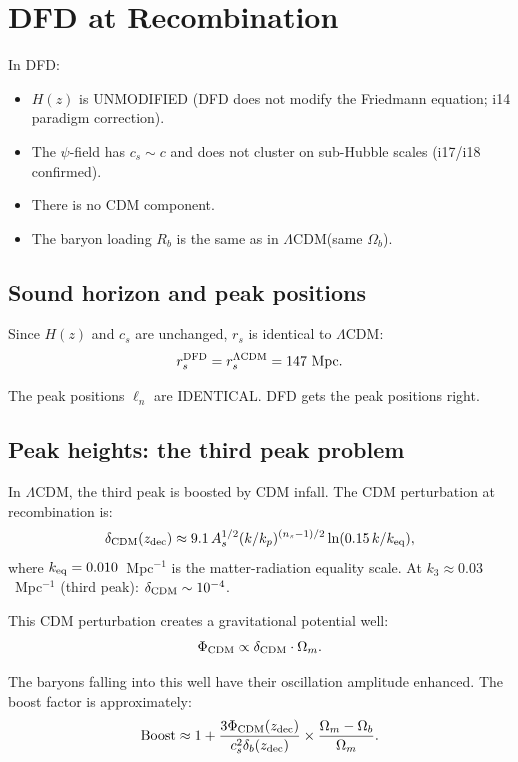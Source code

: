 \documentclass[11pt]{article}
\newcommand{\LCDM}{$\Lambda$CDM}
\newcommand{\Ob}{\Omega_b}
\newcommand{\Om}{\Omega_m}
\begin{document}
\section{DFD at Recombination}

In DFD:
\begin{itemize}
\item $H(z)$ is UNMODIFIED (DFD does not modify the Friedmann
  equation; i14 paradigm correction).
\item The $\psi$-field has $c_s \sim c$ and does not cluster on
  sub-Hubble scales (i17/i18 confirmed).
\item There is no CDM component.
\item The baryon loading $R_b$ is the same as in \LCDM (same $\Ob$).
\end{itemize}

\subsection{Sound horizon and peak positions}

Since $H(z)$ and $c_s$ are unchanged, $r_s$ is identical to \LCDM:
\begin{equation}
r_s^{\rm DFD} = r_s^{\Lambda\rm CDM} = 147\text{ Mpc}.
\end{equation}

The peak positions $\ell_n$ are IDENTICAL. DFD gets the peak
positions right.

\subsection{Peak heights: the third peak problem}

In \LCDM, the third peak is boosted by CDM infall. The CDM
perturbation at recombination is:
\begin{equation}
\delta_{\rm CDM}(z_{\rm dec}) \approx
9.1\,A_s^{1/2}(k/k_p)^{(n_s-1)/2}\ln(0.15\,k/k_{\rm eq}),
\end{equation}
where $k_{\rm eq} = 0.010$~Mpc$^{-1}$ is the matter-radiation
equality scale. At $k_3 \approx 0.03$~Mpc$^{-1}$ (third peak):
$\delta_{\rm CDM} \sim 10^{-4}$.

This CDM perturbation creates a gravitational potential well:
\begin{equation}
\Phi_{\rm CDM} \propto \delta_{\rm CDM}\cdot\Om.
\end{equation}

The baryons falling into this well have their oscillation amplitude
enhanced. The boost factor is approximately:
\begin{equation}
\text{Boost} \approx 1 + \frac{3\Phi_{\rm CDM}(z_{\rm dec})}{c_s^2\delta_b(z_{\rm dec})}
\times\frac{\Om - \Ob}{\Om}.
\end{equation}
\end{document}
